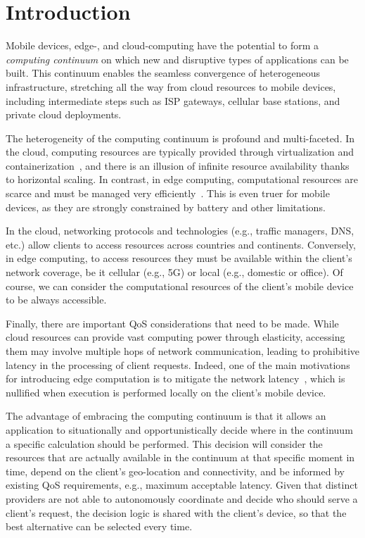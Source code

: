 \section{Introduction}
\label{sec:intro}

Mobile devices, edge-, and cloud-computing have the potential to form a \textit{computing continuum} on which new and disruptive types of applications can be built. This continuum enables the seamless convergence of heterogeneous infrastructure, stretching all the way from cloud resources to mobile devices, including intermediate steps such as ISP gateways, cellular base stations, and private cloud deployments.

The heterogeneity of the computing continuum is profound and multi-faceted. In the cloud, computing resources are typically provided through virtualization and containerization~\cite{leitner2016patterns, Quatrocchi2016discrete}, and there is an illusion of infinite resource availability thanks to horizontal scaling. In contrast, in edge computing, computational resources are scarce and must be managed very efficiently~\cite{GarrigaMendonca2017}. This is even truer for mobile devices, as they are strongly constrained by battery and other limitations. 

In the cloud, networking protocols and technologies (e.g., traffic managers, DNS, etc.) allow clients to access resources across countries and continents. Conversely, in edge computing, to access resources they must be available within the client's network coverage, be it cellular (e.g., 5G) or local (e.g., domestic or office). Of course, we can consider the computational resources of the client's mobile device to be always accessible. %

Finally, there are important QoS considerations that need to be made. While cloud resources can provide vast computing power through elasticity, accessing them may involve multiple hops of network communication, leading to prohibitive latency in the processing of client requests. Indeed, one of the main motivations for introducing edge computation is to mitigate the network latency~\cite{Shi:2016}, which is nullified when execution is performed locally on the client's mobile device.

The advantage of embracing the computing continuum is that it allows an application to situationally and opportunistically decide where in the continuum a specific calculation should be performed. This decision will consider the resources that are actually available in the continuum at that specific moment in time, depend on the client's geo-location and connectivity, and be informed by existing QoS requirements, e.g., maximum acceptable latency. Given that distinct providers are not able to autonomously coordinate and decide who should serve a client's request, the decision logic is shared with the client's device, so that the best alternative can be selected every time.

